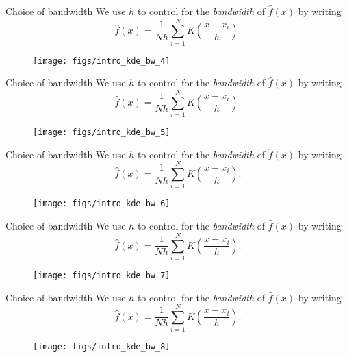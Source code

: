 \documentclass[11pt, aspectratio=149]{beamer}
\theoremstyle{plain}
\begin{document}
\begin{frame}[fragile, t]{Choice of bandwidth}
	We use $h$ to control for the \emph{bandwidth} of $\hat{f}(x)$ by writing
	\begin{equation*}
	\hat{f}(x) = \frac{1}{Nh} \sum_{i=1}^{N} K\left(\frac{x - x_i}{h}\right).
	\end{equation*}
	\vfill
	\begin{figure}
		\centering
		\texttt{[image: figs/intro\_kde\_bw\_4]}
	\end{figure}
\end{frame}


\begin{frame}[fragile, t]{Choice of bandwidth}
	We use $h$ to control for the \emph{bandwidth} of $\hat{f}(x)$ by writing
	\begin{equation*}
	\hat{f}(x) = \frac{1}{Nh} \sum_{i=1}^{N} K\left(\frac{x - x_i}{h}\right).
	\end{equation*}
	\vfill
	\begin{figure}
		\centering
		\texttt{[image: figs/intro\_kde\_bw\_5]}
	\end{figure}
\end{frame}


\begin{frame}[fragile, t]{Choice of bandwidth}
	We use $h$ to control for the \emph{bandwidth} of $\hat{f}(x)$ by writing
	\begin{equation*}
	\hat{f}(x) = \frac{1}{Nh} \sum_{i=1}^{N} K\left(\frac{x - x_i}{h}\right).
	\end{equation*}
	\vfill
	\begin{figure}
		\centering
		\texttt{[image: figs/intro\_kde\_bw\_6]}
	\end{figure}
\end{frame}


\begin{frame}[fragile, t]{Choice of bandwidth}
	We use $h$ to control for the \emph{bandwidth} of $\hat{f}(x)$ by writing
	\begin{equation*}
	\hat{f}(x) = \frac{1}{Nh} \sum_{i=1}^{N} K\left(\frac{x - x_i}{h}\right).
	\end{equation*}
	\vfill
	\begin{figure}
		\centering
		\texttt{[image: figs/intro\_kde\_bw\_7]}
	\end{figure}
\end{frame}


\begin{frame}[fragile, t]{Choice of bandwidth}
	We use $h$ to control for the \emph{bandwidth} of $\hat{f}(x)$ by writing
	\begin{equation*}
	\hat{f}(x) = \frac{1}{Nh} \sum_{i=1}^{N} K\left(\frac{x - x_i}{h}\right).
	\end{equation*}
	\vfill
	\begin{figure}
		\centering
		\texttt{[image: figs/intro\_kde\_bw\_8]}
	\end{figure}
\end{frame}
\end{document}
